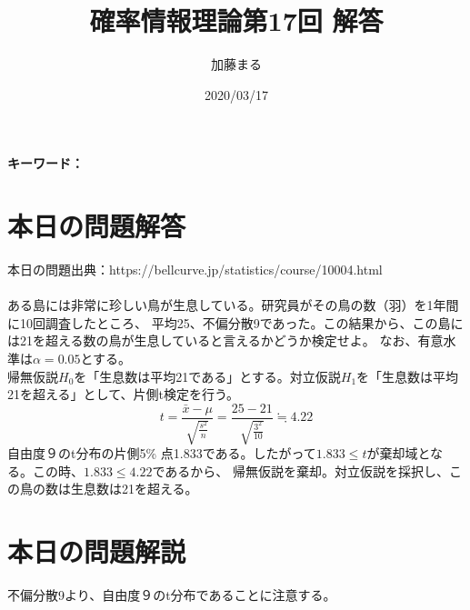 \documentclass[a4j,uplatex,dvipdfmx]{jsarticle}
\title{確率情報理論第17回 解答}
\author{加藤まる}
\date{2020/03/17}
\begin{document}
\maketitle
\bf キーワード：
\rm

\section*{本日の問題解答}
本日の問題出典：https://bellcurve.jp/statistics/course/10004.html \\ \\

ある島には非常に珍しい鳥が生息している。研究員がその鳥の数（羽）を1年間に10回調査したところ、
平均25、不偏分散9であった。この結果から、この島には21を超える数の鳥が生息していると言えるかどうか検定せよ。
なお、有意水準は$α=0.05$とする。
\\
帰無仮説$H_0$を「生息数は平均21である」とする。対立仮説$H_1$を「生息数は平均21を超える」として、片側t検定を行う。
\begin{equation}
  t=\frac{\bar{x}-\mu}{\sqrt{\frac{s^2}{n}}}=\frac{25-21}{\sqrt{\frac{3^2}{10}}} \fallingdotseq 4.22
\end{equation}
自由度９のt分布の片側5\% 点1.833である。したがって$1.833\le t$が棄却域となる。この時、$1.833\le 4.22$であるから、
帰無仮説を棄却。対立仮説を採択し、この鳥の数は生息数は21を超える。

\section*{本日の問題解説}
不偏分散9より、自由度９のt分布であることに注意する。
\end{document}
